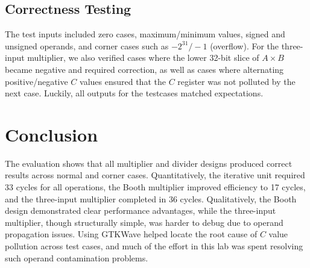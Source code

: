 \documentclass[11pt,a4paper]{article}
\begin{document}
\subsection{Correctness Testing}

The test inputs included zero cases, maximum/minimum values, signed and unsigned
operands, and corner cases such as $-2^{31}/-1$ (overflow).  
For the three-input multiplier, we also verified cases where the lower 32-bit
slice of $A \times B$ became negative and required correction, as well as cases
where alternating positive/negative $C$ values ensured that the $C$
register was not polluted by the next case.  
Luckily, all outputs for the testcases matched expectations.




\section{Conclusion}



The evaluation shows that all multiplier and divider designs produced correct
results across normal and corner cases. Quantitatively, the iterative unit
required 33 cycles for all operations, the Booth multiplier improved efficiency
to 17 cycles, and the three-input multiplier completed in 36 cycles.
Qualitatively, the Booth design demonstrated clear performance advantages, while
the three-input multiplier, though structurally simple, was harder to debug due
to operand propagation issues. Using GTKWave helped locate the root cause of $C$
value pollution across test cases, and much of the effort in this lab was spent
resolving such operand contamination problems.
\end{document}
